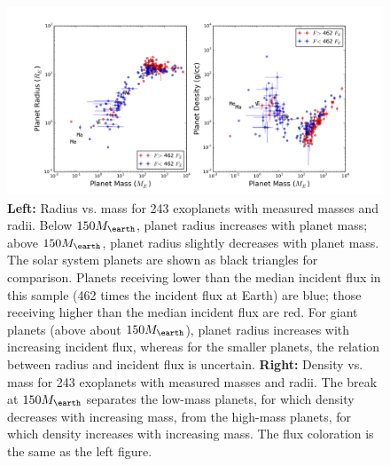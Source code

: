 \documentclass[11pt]{aastex}
\begin{document}
\clearpage
\begin{figure}[htbp] %
   \centering
   \includegraphics[width=6in]{mrf.png} 
   \caption{\small \textbf{Left:} Radius vs. mass for 243 exoplanets with measured masses and radii.  Below $150 \mearth$, planet radius increases with planet mass; above $150 \mearth$, planet radius slightly decreases with planet mass.  The solar system planets are shown as black triangles for comparison.  Planets receiving lower than the median incident flux in this sample (462 times the incident flux at Earth) are blue; those receiving higher than the median incident flux are red.    For giant planets (above about $150 \mearth$), planet radius increases with increasing incident flux, whereas for the smaller planets, the relation between radius and incident flux is uncertain.  \textbf{Right:} Density vs. mass for 243 exoplanets with measured masses and radii.  The break at $150 \mearth$ separates the low-mass planets, for which density decreases with increasing mass, from the high-mass planets, for which density increases with increasing mass.  The flux coloration is the same as the left figure.}
\label{fig:mrf}
\end{figure}
\end{document}
